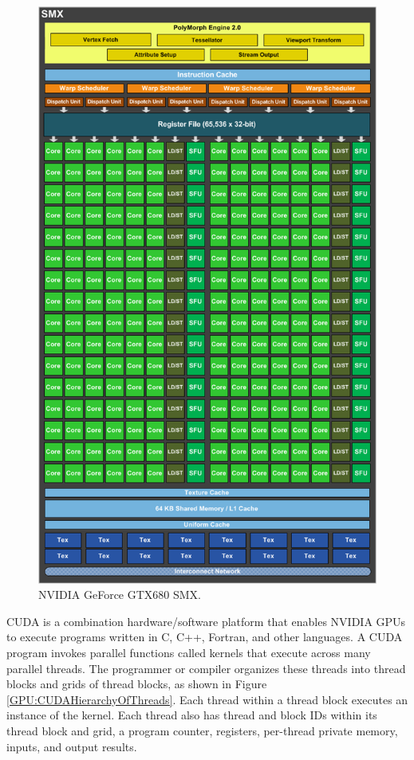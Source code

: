 \begin{figure}
\centering
\includegraphics[width=\textwidth]{GPU/GeForceGTX680SMX.png}
\caption{NVIDIA GeForce GTX680 SMX.}
\label{GPU:GeForceGTX680SMX}
\end{figure}

CUDA is a combination hardware/software platform that enables NVIDIA GPUs to execute programs written in C, C++, Fortran, and other languages. A CUDA program invokes parallel functions called kernels that execute across many parallel threads. The programmer or compiler organizes these threads into thread blocks and grids of thread blocks, as shown in Figure \ref{GPU:CUDAHierarchyOfThreads}. Each thread within a thread block executes an instance of the kernel. Each thread also has thread and block IDs within its thread block and grid, a program counter, registers, per-thread private memory, inputs, and output results.


